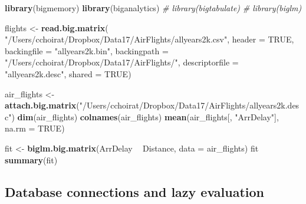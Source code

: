 \documentclass[]{book}
\newenvironment{Shaded}{\begin{snugshade}}{\end{snugshade}}
\newcommand{\KeywordTok}[1]{\textcolor[rgb]{0.13,0.29,0.53}{\textbf{#1}}}
\newcommand{\DataTypeTok}[1]{\textcolor[rgb]{0.13,0.29,0.53}{#1}}
\newcommand{\StringTok}[1]{\textcolor[rgb]{0.31,0.60,0.02}{#1}}
\newcommand{\CommentTok}[1]{\textcolor[rgb]{0.56,0.35,0.01}{\textit{#1}}}
\newcommand{\OtherTok}[1]{\textcolor[rgb]{0.56,0.35,0.01}{#1}}
\newcommand{\OperatorTok}[1]{\textcolor[rgb]{0.81,0.36,0.00}{\textbf{#1}}}
\newcommand{\NormalTok}[1]{#1}
\theoremstyle{definition}
\theoremstyle{definition}
\theoremstyle{definition}
\theoremstyle{remark}
\begin{document}
\begin{Shaded}
\begin{Highlighting}[]
\KeywordTok{library}\NormalTok{(bigmemory)}
\KeywordTok{library}\NormalTok{(biganalytics)}
\CommentTok{# library(bigtabulate)}
\CommentTok{# library(biglm)}

\NormalTok{flights <-}\StringTok{ }\KeywordTok{read.big.matrix}\NormalTok{(}
  \StringTok{"/Users/cchoirat/Dropbox/Data17/AirFlights/allyears2k.csv"}\NormalTok{,}
  \DataTypeTok{header =} \OtherTok{TRUE}\NormalTok{,}
  \DataTypeTok{backingfile =} \StringTok{"allyears2k.bin"}\NormalTok{,}
  \DataTypeTok{backingpath =} \StringTok{"/Users/cchoirat/Dropbox/Data17/AirFlights/"}\NormalTok{,}
  \DataTypeTok{descriptorfile =} \StringTok{"allyears2k.desc"}\NormalTok{,}
  \DataTypeTok{shared =} \OtherTok{TRUE}\NormalTok{)}

\NormalTok{air_flights <-}\StringTok{ }\KeywordTok{attach.big.matrix}\NormalTok{(}\StringTok{"/Users/cchoirat/Dropbox/Data17/AirFlights/allyears2k.desc"}\NormalTok{)}
\KeywordTok{dim}\NormalTok{(air_flights)}
\KeywordTok{colnames}\NormalTok{(air_flights)}
\KeywordTok{mean}\NormalTok{(air_flights[, }\StringTok{"ArrDelay"}\NormalTok{], }\DataTypeTok{na.rm =} \OtherTok{TRUE}\NormalTok{)}

\NormalTok{fit <-}\StringTok{ }\KeywordTok{biglm.big.matrix}\NormalTok{(ArrDelay }\OperatorTok{~}\StringTok{ }\NormalTok{Distance, }\DataTypeTok{data =}\NormalTok{ air_flights)}
\NormalTok{fit}
\KeywordTok{summary}\NormalTok{(fit)}
\end{Highlighting}
\end{Shaded}

\subsection{Database connections and lazy
evaluation}\label{database-connections-and-lazy-evaluation}
\end{document}
